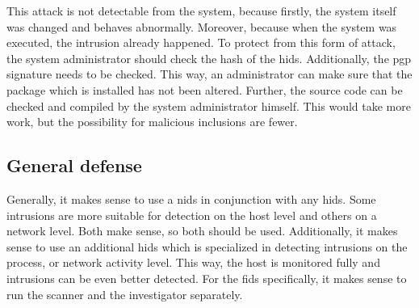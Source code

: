 This attack is not detectable from the system, because firstly, the system itself was changed and behaves abnormally. Moreover, because when the system was executed, the intrusion already happened. To protect from this form of attack, the system administrator should check the hash of the \gls{hids}. Additionally, the \gls{pgp} signature needs to be checked. This way, an administrator can make sure that the package which is installed has not been altered. Further, the source code can be checked and compiled by the system administrator himself. This would take more work, but the possibility for malicious inclusions are fewer. 

\subsection{General defense}
\label{sec:defense:general}

Generally, it makes sense to use a \gls{nids} in conjunction with any \gls{hids}. Some intrusions are more suitable for detection on the host level and others on a network level. Both make sense, so both should be used. Additionally, it makes sense to use an additional \gls{hids} which is specialized in detecting intrusions on the process, or network activity level. This way, the host is monitored fully and intrusions can be even better detected. For the \gls{fids}  specifically, it makes sense to run the scanner and the investigator separately.
